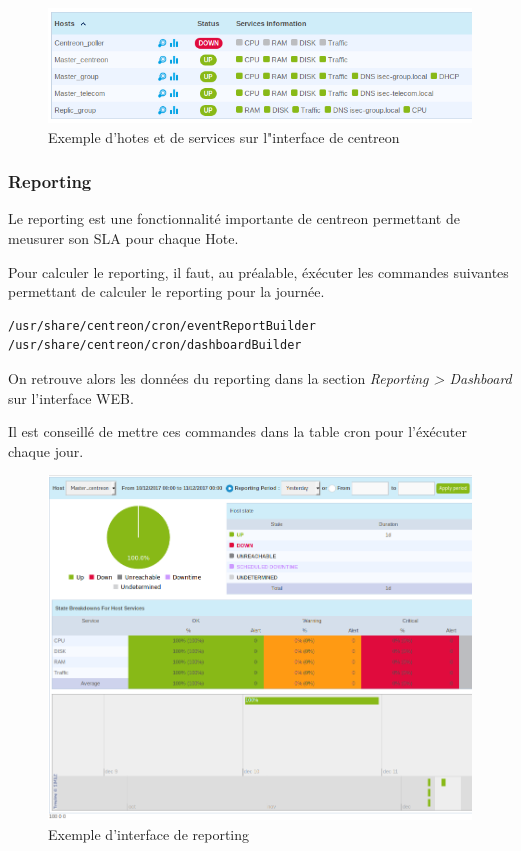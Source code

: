		\begin{figure}[h]
			\centering
			\includegraphics[scale=0.5]{Supervision/service-grid.png}
			\caption{Exemple d'hotes et de services sur l"interface de centreon}
		\end{figure}

		\subsubsection{Reporting}

		Le reporting est une fonctionnalité importante de centreon permettant de meusurer son SLA pour chaque Hote.

		Pour calculer le reporting, il faut, au préalable, éxécuter les commandes suivantes permettant de calculer le reporting pour la journée.

		\begin{lstlisting}[caption=Commandes permettant de calculer le reporting pour la journée en cours]
/usr/share/centreon/cron/eventReportBuilder
/usr/share/centreon/cron/dashboardBuilder
		\end{lstlisting}

		On retrouve alors les données du reporting dans la section \emph{Reporting > Dashboard} sur l'interface WEB.

		Il est conseillé de mettre ces commandes dans la table cron pour l'éxécuter chaque jour.

		\begin{figure}[h]
			\centering
			\includegraphics[scale=0.5]{Supervision/monitoring.png}
			\caption{Exemple d'interface de reporting}
		\end{figure}

